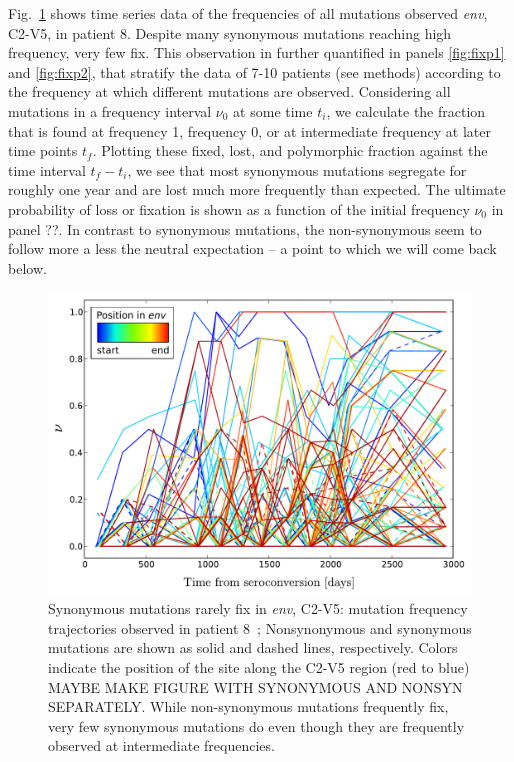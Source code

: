 \documentclass[rmp, twocolumn]{revtex4}
\newcommand{\env}{\textit{env}}
\newcommand{\FIG}[1]{Fig.~\ref{fig:#1}}
\begin{document}
\FIG{aft} shows time series data of the frequencies of all mutations observed
\env, C2-V5, in patient 8\citep{shankarappa_consistent_1999,liu_selection_2006}.
Despite many synonymous mutations reaching high frequency, very few fix. This
observation in further quantified in panels \ref{fig:fixp1} and
\ref{fig:fixp2}, that stratify the data of
7-10 patients (see methods) according to the frequency at which different
mutations are observed. Considering all mutations in a frequency interval
$\nu_0$ at some time $t_i$, we calculate the fraction that is found at frequency
1, frequency 0, or at intermediate frequency at later time points $t_f$.
Plotting these fixed, lost, and polymorphic fraction against the time interval
$t_f-t_i$, we see that most synonymous mutations segregate for roughly one year
and are lost  much more frequently than expected. The ultimate probability of
loss or fixation is shown as a function of the initial frequency $\nu_0$ in
panel ??. In contrast to synonymous mutations, the non-synonymous seem to follow
more a less the neutral expectation -- a point to which we will come back below. 


\begin{figure}
\begin{center}
\includegraphics[width=\linewidth]{Shankarappa_allele_freqs_trajectories_syn_nonsynp8}
\caption{Synonymous mutations rarely fix in \env, C2-V5: mutation frequency
 trajectories observed in patient 8~\cite{shankarappa_consistent_1999};
 Nonsynonymous and synonymous mutations are shown as solid and dashed lines,
 respectively. Colors indicate the position of the site along the C2-V5 region
 (red to blue) MAYBE MAKE FIGURE WITH SYNONYMOUS AND NONSYN
 SEPARATELY. While non-synonymous mutations frequently fix, very few synonymous
mutations do even though they are frequently observed at intermediate
frequencies.}
\label{fig:aft}
\end{center}
\end{figure}
\end{document}
